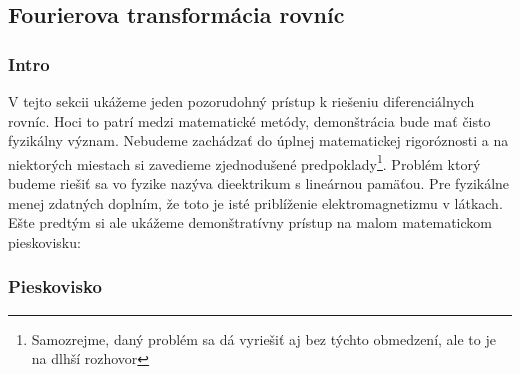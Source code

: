 \subsection{Fourierova transformácia rovníc}

\subsubsection{Intro}


V tejto sekcii ukážeme jeden pozorudohný prístup k riešeniu
diferenciálnych rovníc. Hoci to patrí medzi matematické
metódy, demonštrácia bude mať čisto fyzikálny význam. Nebudeme
zachádzať do úplnej matematickej rigoróznosti a na niektorých miestach
si zavedieme zjednodušené predpoklady\footnote{Samozrejme, daný
problém sa dá vyriešiť aj bez týchto obmedzení, ale to je na dlhší
rozhovor}. Problém ktorý budeme riešiť sa vo fyzike nazýva dieektrikum
s lineárnou pamäťou. Pre fyzikálne menej zdatných doplním, že toto je
isté priblíženie elektromagnetizmu v látkach. Ešte predtým si ale
ukážeme demonštratívny prístup na malom matematickom pieskovisku:

\subsubsection{Pieskovisko}

